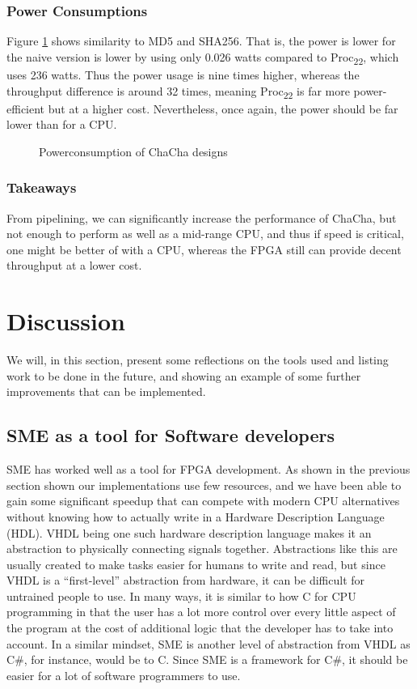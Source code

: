 \documentclass[a4paper, openany]{memoir}
\begin{document}
\begin{abstact}
\subsection{Power Consumptions}
\label{sec:org5073afc}
Figure \ref{fig:ChaCha_power} shows similarity to MD5 and SHA256. That is, the power is lower for the naive version is lower by using only 0.026 watts compared to Proc\textsubscript{22}, which uses 236 watts. Thus the power usage is nine times higher, whereas the throughput difference is around 32 times, meaning Proc\textsubscript{22} is far more power-efficient but at a higher cost. Nevertheless, once again, the power should be far lower than for a CPU.

\begin{figure}[H]
\centering
{}
\caption[Power consumption of ChaCha20 designs]
{Powerconsumption of ChaCha designs}
\label{fig:ChaCha_power}
\end{figure}
\subsection{Takeaways}
\label{sec:orgae03733}
From pipelining, we can significantly increase the performance of ChaCha, but not enough to perform as well as a mid-range CPU, and thus if speed is critical, one might be better of with a CPU, whereas the FPGA still can provide decent throughput at a lower cost.

\chapter{Discussion}
\label{sec:org959e204}
We will, in this section, present some reflections on the tools used and listing work to be done in the future, and showing an example of some further improvements that can be implemented.

\section{SME as a tool for Software developers}
\label{sec:org562f856}
SME has worked well as a tool for FPGA development. As shown in the previous section shown our implementations use few resources, and we have been able to gain some significant speedup that can compete with modern CPU alternatives without knowing how to actually write in a Hardware Description Language (HDL). VHDL being one such hardware description language makes it an abstraction to physically connecting signals together.
Abstractions like this are usually created to make tasks easier for humans to write and read,
but since VHDL is a ``first-level'' abstraction from hardware, it can be difficult for untrained people to use. In many ways, it is similar to how C for CPU programming in that the user has a lot more control over every little aspect of the program at the cost of additional logic that the developer has to take into account.
In a similar mindset, SME is another level of abstraction from VHDL as C\#, for instance, would be to C. Since SME is a framework for C\#, it should be easier for a lot of software programmers to use.


\end{abstact}
\end{document}
